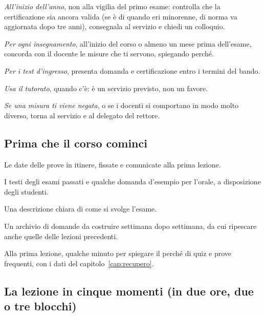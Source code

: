 \begin{controlli}
  \item \emph{All'inizio dell'anno}, non alla vigilia del primo esame:
        controlla che la certificazione sia ancora valida (se è di quando eri minorenne, di norma va aggiornata dopo tre anni), consegnala al servizio e chiedi un colloquio.
  \item \emph{Per ogni insegnamento}, all'inizio del corso o almeno un
        mese prima dell'esame, concorda con il docente le misure che ti
        servono, spiegando perché.
  \item \emph{Per i test d'ingresso}, presenta domanda e certificazione
        entro i termini del bando.
  \item \emph{Usa il tutorato}, quando c'è: è un servizio previsto, non
        un favore.
  \item \emph{Se una misura ti viene negata}, o se i docenti si
        comportano in modo molto diverso, torna al servizio e al
        delegato del rettore.
\end{controlli}


\subsection*{Prima che il corso cominci}

\begin{controlli}
  \item Le date delle prove in itinere, fissate e comunicate alla prima
        lezione.
  \item I testi degli esami passati e qualche domanda d'esempio per
        l'orale, a disposizione degli studenti.
  \item Una descrizione chiara di come si svolge l'esame.
  \item Un archivio di domande da costruire settimana dopo settimana, da
        cui ripescare anche quelle delle lezioni precedenti.
  \item Alla prima lezione, qualche minuto per spiegare il perché di
        quiz e prove frequenti, con i dati del
        capitolo~\ref{cap:recupero}.
\end{controlli}

\subsection*{La lezione in cinque momenti (in due ore, due o tre blocchi)}

